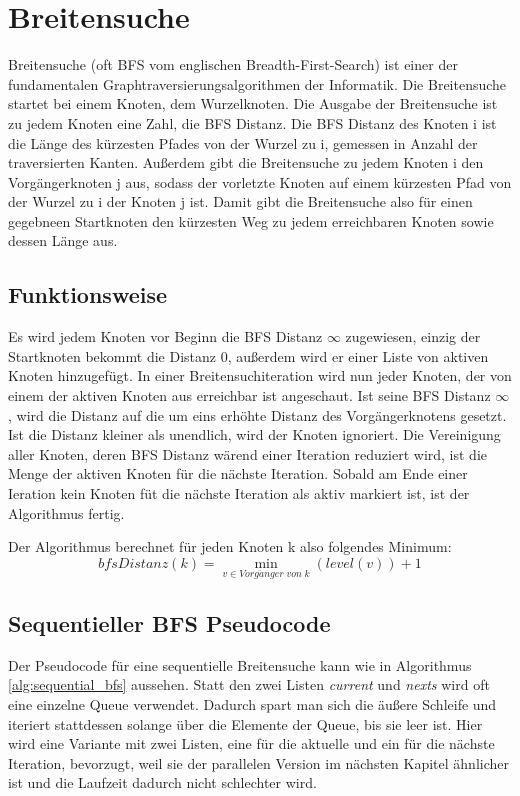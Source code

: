 \section{Breitensuche} %
\label{sec:breitensuche}

Breitensuche (oft BFS vom englischen Breadth-First-Search) ist einer der fundamentalen Graphtraversierungsalgorithmen der Informatik. Die Breitensuche startet bei einem Knoten, dem Wurzelknoten. Die Ausgabe der Breitensuche ist zu jedem Knoten eine Zahl, die BFS Distanz. Die BFS Distanz des Knoten i ist die Länge des kürzesten Pfades von der Wurzel zu i, gemessen in Anzahl der traversierten Kanten. Außerdem gibt die Breitensuche zu jedem Knoten i den Vorgängerknoten j aus, sodass der vorletzte Knoten auf einem kürzesten Pfad von der Wurzel zu i der Knoten j ist. Damit gibt die Breitensuche also für einen gegebneen Startknoten den kürzesten Weg zu jedem erreichbaren Knoten sowie dessen Länge aus.

\subsection{Funktionsweise} %
\label{sub:funktionsweise}
Es wird jedem Knoten vor Beginn die BFS Distanz $ \infty $ zugewiesen, einzig der Startknoten bekommt die Distanz 0, außerdem wird er einer Liste von aktiven Knoten hinzugefügt. In einer Breitensuchiteration wird nun jeder Knoten, der von einem der aktiven Knoten aus erreichbar ist angeschaut. Ist seine BFS Distanz $ \infty $, wird die Distanz auf die um eins erhöhte Distanz des Vorgängerknotens gesetzt. Ist die Distanz kleiner als unendlich, wird der Knoten ignoriert. Die Vereinigung aller Knoten, deren BFS Distanz wärend einer Iteration reduziert wird, ist die Menge der aktiven Knoten für die nächste Iteration. Sobald am Ende einer Ieration kein Knoten füt die nächste Iteration als aktiv markiert ist, ist der Algorithmus fertig. 

Der Algorithmus berechnet für jeden Knoten k also folgendes Minimum\cite{Hassaan:2010:OUA:1854273.1854341}:
$$
bfsDistanz(k) =  \min_{v \in Vorg\ddot{a}nger \; von \; k} (level(v))+1
$$


\subsection{Sequentieller BFS Pseudocode} %
\label{sub:sequentieller_bfs_pseudocode}
Der Pseudocode für eine sequentielle Breitensuche kann wie in Algorithmus \ref{alg:sequential_bfs} aussehen. Statt den zwei Listen \textit{current} und \textit{nexts} wird oft eine einzelne Queue verwendet. Dadurch spart man sich die äußere Schleife und iteriert stattdessen solange über die Elemente der Queue, bis sie leer ist. Hier wird eine Variante mit zwei Listen, eine für die aktuelle und ein für die nächste Iteration, bevorzugt, weil sie der parallelen Version im nächsten Kapitel ähnlicher ist und die Laufzeit dadurch nicht schlechter wird.

